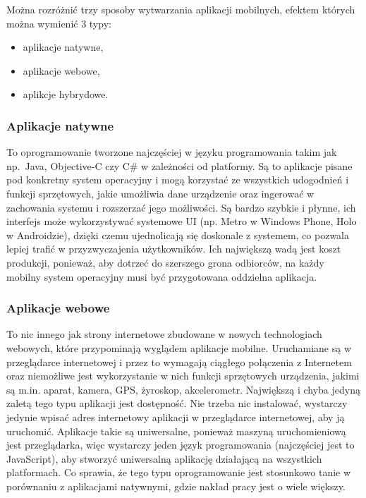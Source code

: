 \documentclass[twoside,a4paper,openright,12pt]{book}
\begin{document}
Można rozróżnić trzy sposoby wytwarzania aplikacji mobilnych, efektem których można wymienić 3 typy:
\begin{itemize}
\item aplikacje natywne,
\item aplikacje webowe,
\item aplikcje hybrydowe.
\end{itemize}

\subsubsection*{Aplikacje natywne}
To oprogramowanie tworzone najczęściej w języku programowania takim jak np.~Java, Objective-C czy C\# w zależności od platformy. Są to aplikacje pisane pod konkretny system operacyjny i mogą korzystać ze wszystkich udogodnień i funkcji sprzętowych, jakie umożliwia dane urządzenie oraz ingerować w zachowania systemu i rozszerzać jego możliwości. Są bardzo szybkie i płynne, ich interfejs może wykorzystywać systemowe UI (np. Metro w Windows Phone, Holo w Androidzie), dzięki czemu ujednolicają się doskonale z systemem, co pozwala lepiej trafić w przyzwyczajenia użytkowników. Ich największą wadą jest koszt produkcji, ponieważ, aby dotrzeć do szerszego grona odbiorców, na każdy mobilny system operacyjny musi być przygotowana oddzielna aplikacja.

\subsubsection*{Aplikacje webowe}
To nic innego jak strony internetowe zbudowane w nowych technologiach webowych, które przypominają wyglądem aplikacje mobilne. Uruchamiane są w przeglądarce internetowej i przez to wymagają ciągłego połączenia z Internetem oraz niemożliwe jest wykorzystanie w nich funkcji sprzętowych urządzenia, jakimi są m.in. aparat, kamera, GPS, żyroskop, akcelerometr. Największą i chyba jedyną zaletą tego typu aplikacji jest dostępność. Nie trzeba nic instalować, wystarczy jedynie wpisać adres internetowy aplikacji w przeglądarce internetowej, aby ją uruchomić. Aplikacje takie są uniwersalne, ponieważ maszyną uruchomieniową jest przeglądarka, więc wystarczy jeden język programowania (najczęściej jest to JavaScript), aby stworzyć uniwersalną aplikację działającą na wszystkich platformach. Co sprawia, że tego typu oprogramowanie jest stosunkowo tanie w porównaniu z aplikacjami natywnymi, gdzie nakład pracy jest o wiele większy.
\end{document}
